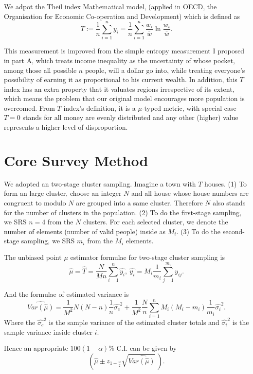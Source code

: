 \documentclass[12pt]{article}%
\begin{document}
We adpot the Theil index Mathematical model, (applied in OECD, 
the Organisation for Economic Co-operation and Development) 
which is defined as 
$$T:=\frac{1}{n}\sum_{i=1}^{n}y_i
=\frac{1}{n}\sum_{i=1}^n \frac{w_i}{\bar{w}}\ln{ \frac{w_i}{\bar{w}} }.$$

This measurement is improved 
from the simple entropy measurement I proposed in part A, 
which treats income inequality as the uncertainty of 
whose pocket, among those all possible $n$ people, will a dollar go into, 
while treating everyone's possibility of earning it as 
proportional to his current wealth. 
In addition, this $T$ index has an extra property that 
it valuates regions irrespective of its extent, 
which means the problem that 
our original model encourages more population is overcomed.
From $T$ index's definition, it is a $\mu$-typed metric, with special case 
$T=0$ stands for all money are evenly distributed 
and any other (higher) value represents a higher level of disproportion.

\section{Core Survey Method}
We adopted an two-stage cluster sampling. 
Imagine a town with $T$ houses. 
(1) To form an large cluster, choose an integer $N$ 
and all house whose house numbers are congruent to modulo $N$
are grouped into a same cluster. 
Therefore $N$ also stands for the number of clusters in the population. 
(2) To do the first-stage sampling, we SRS $n=4$ from the $N$ clusters. 
For each selected cluster,
we denote the number of elements (number of valid people) inside as $M_i$.
(3) To do the second-stage sampling, we SRS $m_i$ from the $M_i$ elements.

The unbiased point $\mu$ estimator formulae for two-stage cluster sampling is 
$$\hat{\mu}=\hat{T}=\frac{N}{Mn} \sum_{i=1}^n \hat{y_i},~
\hat{y_i}=M_i\frac{1}{m_i} \sum_{j=1}^{m_i}y_{ij}.$$

And the formulae of estimated variance is 
$$\widehat{Var(\hat{\mu})} = 
\frac{1}{M^2}N(N-n)\frac{1}{n}\hat{\sigma_c}^2
+\frac{1}{M^2}\frac{N}{n}\sum_{i=1}^{n}M_i(M_i-m_i)\frac{1}{m_i}\hat{\sigma_i}^2.$$ 
Where the $\hat{\sigma_c}^2$ is the sample variance of the estimated cluster
totals and $\hat{\sigma_i}^2$ is the sample variance inside cluster $i$.

Hence an appropriate $100(1-\alpha)\% $ C.I. can be given by 
$$(\hat{\mu} \pm z_{1-\frac{\alpha}{2}} \sqrt{\widehat{Var(\hat{\mu})}}~).$$
\end{document}

